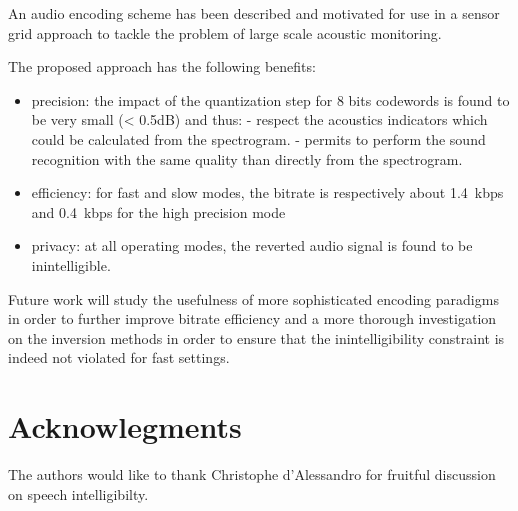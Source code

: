 \documentclass[final,3p,times,twocolumn]{elsarticle}
\begin{document}
An audio encoding scheme has been described and motivated for use in a sensor grid approach to tackle the problem of large scale acoustic monitoring.

The proposed approach has the following benefits:
\begin{itemize}
	\item precision: the impact of the quantization step for 8 bits codewords is found to be very small (< 0.5dB) and thus:
	- respect the acoustics indicators which could be calculated from the spectrogram.
	- permits to perform the sound recognition with the same quality than directly from the spectrogram.
	\item efficiency: for fast and slow modes, the bitrate is respectively about 1.4~kbps and 0.4~kbps for the high precision mode
	\item privacy: at all operating modes, the reverted audio signal is found to be inintelligible.
\end{itemize}


Future work will study the usefulness of more sophisticated encoding paradigms in order to further improve bitrate efficiency and a more thorough investigation on the inversion methods in order to ensure that the inintelligibility constraint is indeed not violated for fast settings.



\section{Acknowlegments}

The authors would like to thank Christophe d'Alessandro for fruitful discussion on speech intelligibilty.

\clearpage






\end{document}

